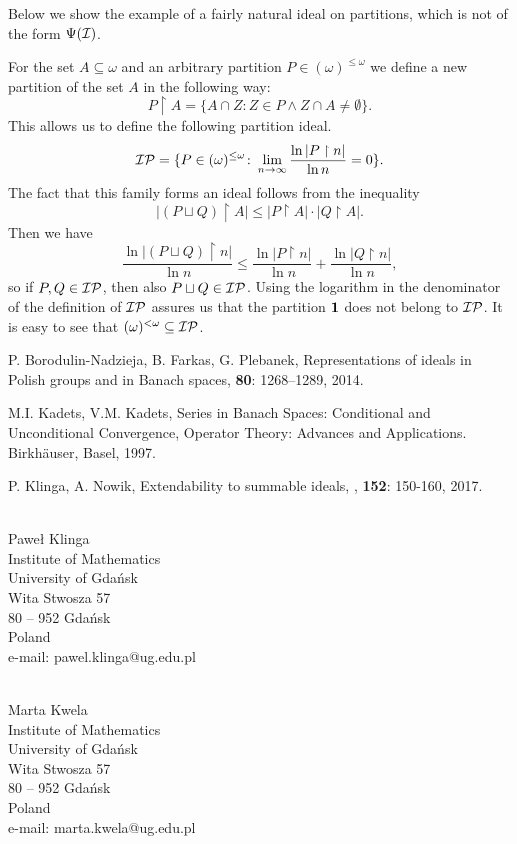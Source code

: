 \documentclass[12pt]{article}
\theoremstyle{plain}
\theoremstyle{definition}
\theoremstyle{remark}
\newcommand{\cI}{{\cal I}}
\newcommand{\cP}{{\cal P}}
\newcommand{\Part}{(\omega)^{\leq\omega}}
\newcommand{\FinPart}{(\omega)^{<\omega}}
\begin{document}
Below we show the example of a fairly natural ideal on partitions, which is not of the form $\Psi(\cI)$.

For the set $A \subseteq \omega$ and an arbitrary partition $P\in\Part$ we define a new partition of the set $A$ in the following way:
$$P\restriction A = \{A \cap Z\colon
Z \in P \wedge Z\cap A \not=\emptyset\}.$$
This allows us to define the following partition ideal.
$$\cI\cP = \{P \in \Part\colon \lim_{n\to\infty} \frac{\ln |P \restriction n|}{\ln n} = 0\}.$$
The fact that this family forms an ideal follows from the inequality
$$|(P \sqcup Q) \restriction A| \leq |P \restriction A| \cdot |Q \restriction A|.$$
Then we have 
$$\frac{\ln |(P \sqcup Q) \restriction n|}{\ln n} \leq \frac{\ln |P \restriction n|}{\ln n} + \frac{\ln |Q \restriction n|}{\ln n},$$
so if $P,Q\in\cI\cP$, then also $P \sqcup Q\in\cI\cP$.
Using the logarithm in the denominator of the definition of $\cI\cP$ assures us that the partition ${\bf 1}$ does not belong to $\cI\cP$.
It is easy to see that $\FinPart\subseteq \cI\cP$. 

\newcommand{\nosort}[1]{}
\begin{thebibliography}{1}
	P. Borodulin-Nadzieja, B. Farkas, G. Plebanek, \newblock Representations of ideals in Polish groups and in Banach spaces,  {\bf 80}: 1268–1289, 2014.
	
	M.I. Kadets, V.M. Kadets, \newblock Series in Banach Spaces: Conditional and Unconditional Convergence, Operator Theory: Advances and Applications. Birkhäuser, Basel, 1997.
	
	P. Klinga, A. Nowik,
	\newblock Extendability to summable ideals,
	, {\bf 152}: 150-160, 2017. $\,$
	

\end{thebibliography}


\begin{center}
	 \\
	Pawe\l{} Klinga \\
	Institute of Mathematics \\
	University of Gda\'nsk \\
	Wita Stwosza 57 \\
	80 -- 952 Gda\'nsk \\
	Poland\\
	e-mail: pawel.klinga@ug.edu.pl
\end{center}

\begin{center}
	 \\
	Marta Kwela \\
	Institute of Mathematics \\
	University of Gda\'nsk \\
	Wita Stwosza 57 \\
	80 -- 952 Gda\'nsk \\
	Poland\\
	e-mail: marta.kwela@ug.edu.pl
\end{center}
\end{document}
